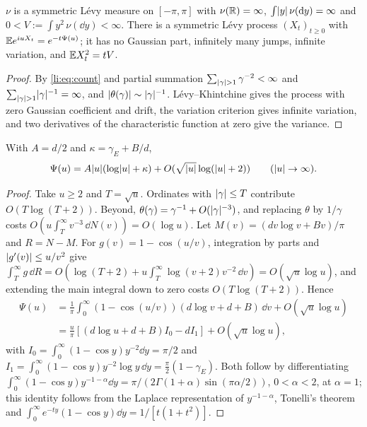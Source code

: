 \begin{lemma}\label{li:lem:levy}
$\nu$ is a symmetric L\'evy measure on $[-\pi,\pi]$ with $\nu(\mathbb{R})=\infty$, $\int\lvert y\rvert\,\nu(\mathrm{d} y)=\infty$
and $0<V:=\int y^2\,\nu(\dd y)<\infty$. There is a symmetric L\'evy process $(X_t)_{t\ge0}$ with
$\mathbb{E} e^{iuX_t}=e^{-t\Psi(u)}$; it has no Gaussian part, infinitely many jumps, infinite variation,
and $\mathbb{E} X_t^2=tV$.
\end{lemma}

\begin{proof}
By \eqref{li:eq:count} and partial summation $\sum_{\lvert\gamma\rvert>1}\gamma^{-2}<\infty$ and
$\sum_{\lvert\gamma\rvert>1}\lvert\gamma\rvert^{-1}=\infty$, and $\lvert\theta(\gamma)\rvert\sim\lvert\gamma\rvert^{-1}$. L\'evy--Khintchine
gives the process with zero Gaussian coefficient and drift, the variation criterion gives infinite
variation, and two derivatives of the characteristic function at zero give the variance.
\end{proof}

\begin{lemma}\label{li:lem:symbol}
With $A=d/2$ and $\kappa=\gamma_E+B/d$,
\[
 \Psi(u)=A\lvert u\rvert(\log\lvert u\rvert+\kappa)+O(\sqrt{\lvert u\rvert}\log(\lvert u\rvert+2))\qquad(\lvert u\rvert\to\infty).
\]
\end{lemma}

\begin{proof}
Take $u\ge2$ and $T=\sqrt u$. Ordinates with $\lvert\gamma\rvert\le T$ contribute $O(T\log(T+2))$. Beyond,
$\theta(\gamma)=\gamma^{-1}+O(\lvert\gamma\rvert^{-3})$, and replacing $\theta$ by $1/\gamma$ costs
$O(u\int_T^\infty v^{-3}\,\dd N(v))=O(\log u)$. Let $M(v)=(dv\log v+Bv)/\pi$ and $R=N-M$. For
$g(v)=1-\cos(u/v)$, integration by parts and $\lvert g'(v)\rvert\le u/v^2$ give
$\int_T^\infty g\,\dd R=O(\log(T+2)+u\int_T^\infty\log(v+2)v^{-2}\,\dd v)=O(\sqrt u\log u)$, and extending the
main integral down to zero costs $O(T\log(T+2))$. Hence
\begin{align*}
 \Psi(u)&=\frac1\pi\int_0^\infty(1-\cos(u/v))(d\log v+d+B)\,\dd v+O(\sqrt u\log u)\\
 &=\frac u\pi[(d\log u+d+B)I_0-dI_1]+O(\sqrt u\log u),
\end{align*}
with $I_0=\int_0^\infty(1-\cos y)y^{-2}\dd y=\pi/2$ and
$I_1=\int_0^\infty(1-\cos y)y^{-2}\log y\,\dd y=\frac\pi2(1-\gamma_E)$. Both follow by differentiating
$\int_0^\infty(1-\cos y)y^{-1-\alpha}\dd y=\pi/(2\Gamma(1+\alpha)\sin(\pi\alpha/2))$, $0<\alpha<2$, at
$\alpha=1$; this identity follows from the Laplace representation of $y^{-1-\alpha}$, Tonelli's theorem
and $\int_0^\infty e^{-ty}(1-\cos y)\dd y=1/[t(1+t^2)]$.
\end{proof}

